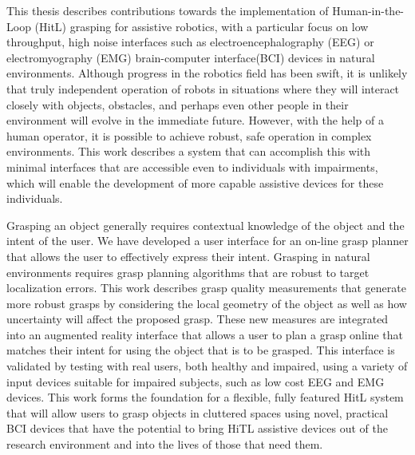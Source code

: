 This thesis describes contributions towards the implementation of Human-in-the-Loop (HitL) grasping for assistive robotics, with a particular focus on low throughput, high noise interfaces such as electroencephalography (EEG) or electromyography (EMG) brain-computer interface(BCI) devices in natural environments. Although progress in the robotics field has been swift, it is unlikely that truly independent operation of robots in situations where they will interact closely with objects, obstacles, and perhaps even other people in their environment will evolve in the immediate future. However, with the help of a human operator, it is possible to achieve robust, safe operation in complex environments. This work describes a system that can accomplish this with minimal interfaces that are accessible even to individuals with impairments, which will enable the development of more capable assistive devices for these individuals. 

Grasping an object generally requires contextual knowledge of the object and the intent of the user. We have developed a user interface for an on-line grasp planner that allows the user to effectively express their intent. Grasping in natural environments requires grasp planning algorithms that are robust to target localization errors.  This work describes grasp quality measurements that generate more robust grasps by considering the local geometry of the object as well as how uncertainty will affect the proposed grasp. These new measures are integrated into an augmented reality interface that allows a user to plan a grasp online that matches their intent for using the object that is to be grasped.  This interface is validated by testing with real users, both healthy and impaired, using a variety of input devices suitable for impaired subjects, such as low cost EEG and EMG devices. This work forms the foundation for a flexible, fully featured HitL system that will allow users to grasp objects in cluttered spaces using novel, practical BCI devices that have the potential to bring HiTL assistive devices out of the research environment and into the lives of those that need them. 
